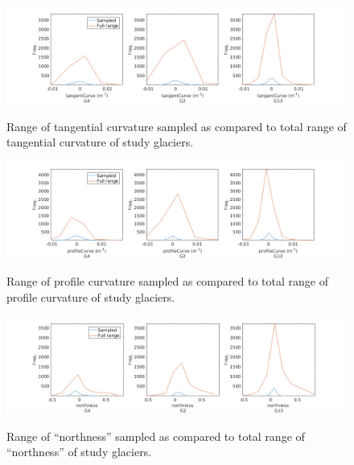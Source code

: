 \documentclass[12pt]{article}
\begin{document}
\begin{landscape}
\begin{figure}
	\centering
	\includegraphics[height = 0.4\textwidth]{SampledRangeTopo_tangentCurve.png}\\
	\caption{Range of tangential curvature sampled as compared to total range of tangential curvature of study glaciers.}
	\label{sampledRange:tangentC}
\end{figure}

\begin{figure}
	\centering
	\includegraphics[height = 0.4\textwidth]{SampledRangeTopo_profileCurve.png}\\
	\caption{Range of profile curvature sampled as compared to total range of profile curvature of study glaciers.}
	\label{sampledRange:profileC}
\end{figure}

\begin{figure}
	\centering
	\includegraphics[height = 0.4\textwidth]{SampledRangeTopo_northness.png}\\
	\caption{Range of ``northness'' sampled as compared to total range of ``northness'' of study glaciers.}
	\label{sampledRange:northness}
\end{figure}


\end{landscape}
\end{document}
